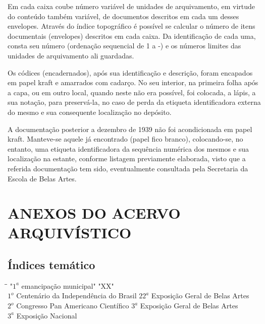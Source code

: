 Em cada caixa coube número variável de unidades de arquivamento, em virtude do conteúdo também variável, de documentos descritos em cada um desses envelopes. Através do índice topográfico é possível se calcular o número de itens documentais (envelopes) descritos em cada caixa. Da identificação de cada uma, consta seu número (ordenação sequencial de 1 a -) e os números limites das unidades de arquivamento ali guardadas.

Os códices (encadernados), após sua identificação e descrição, foram encapados em papel kraft e amarrados com cadarço. No seu interior, na primeira folha após a capa, ou em outro local, quando neste não era possível, foi colocada, a lápis, a sua notação, para preservá-la, no caso de perda da etiqueta identificadora externa do mesmo e sua consequente localização no depósito.

A documentação posterior a dezembro de 1939 não foi acondicionada em papel kraft. Manteve-se aquele já encontrado (papel fico branco), colocando-se, no entanto, uma etiqueta identificadora da sequência numérica dos mesmos e sua localização na estante, conforme listagem previamente elaborada, visto que a referida documentação tem sido, eventualmente consultada pela Secretaria da Escola de Belas Artes.

\section{ANEXOS DO ACERVO ARQUIVÍSTICO}

\subsection{Índices temático}

\begin{tabbing}
	\hspace{8,7cm}\=\hspace{1cm}\=\kill
	"$1^a$ emancipação municipal"	\> "XX"\\
	 $1^o$ Centenário da Independência do Brasil \> $22^a$ Exposição Geral de Belas Artes\\
	 $2^o$ Congresso Pan Americano Científico\> $3^a$ Exposição Geral de Belas Artes \\	
	 $3^a$ Exposição Nacional\> \\
	
	
\end{tabbing}

